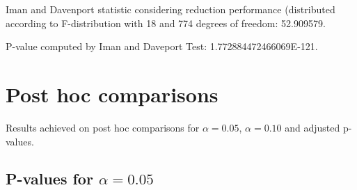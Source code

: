 \documentclass[a4paper,10pt]{article}
\begin{document}
\begin{landscape}
Iman and Davenport statistic considering reduction performance (distributed according to F-distribution with 18 and 774 degrees of freedom: 52.909579.

P-value computed by Iman and Daveport Test: 1.772884472466069E-121.\newline



\pagebreak

\section{Post hoc comparisons}

Results achieved on post hoc comparisons for $\alpha = 0.05$, $\alpha = 0.10$ and adjusted p-values.

\subsection{P-values for $\alpha=0.05$}


\end{landscape}
\end{document}

